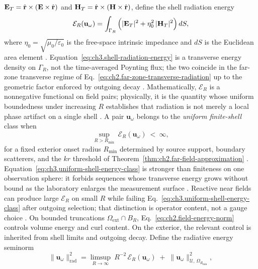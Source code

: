 \(\mathbf{E}_{T}=\hat{\mathbf{r}}\times(\mathbf{E}\times\hat{\mathbf{r}})\) and
\(\mathbf{H}_{T}=\hat{\mathbf{r}}\times(\mathbf{H}\times\hat{\mathbf{r}})\), define the shell radiation energy
\begin{equation}
\label{eq:ch3.shell-radiation-energy}
\mathcal{E}_{R}(\mathbf{u}_\omega)
=
\int_{\Gamma_R}
\Big(
|\mathbf{E}_{T}|^{2}+\eta_0^{2}\,|\mathbf{H}_{T}|^{2}
\Big)\,dS,
\end{equation}
where \(\eta_0=\sqrt{\mu_0/\varepsilon_0}\) is the free-space intrinsic impedance and \(dS\) is the
Euclidean area element \cite{stratton1941}. Equation~\eqref{eq:ch3.shell-radiation-energy}
is a transverse energy density on \(\Gamma_R\), not the time-averaged Poynting flux; the two coincide in
the far-zone transverse regime of Eq.~\eqref{eq:ch2.far-zone-transverse-radiation} up to the geometric
factor enforced by outgoing decay \cite{stratton1941}. Mathematically,
\(\mathcal{E}_{R}\) is a nonnegative functional on field pairs; physically, it is the quantity whose
uniform boundedness under increasing \(R\) establishes that radiation is not merely a local phase artifact
on a single shell \cite{harrington2001}.
A pair \(\mathbf{u}_\omega\) belongs to the \emph{uniform finite-shell} class when
\begin{equation}
\label{eq:ch3.uniform-shell-energy-class}
\sup_{R>R_{\min}}\ \mathcal{E}_{R}(\mathbf{u}_\omega)\ <\ \infty,
\end{equation}
for a fixed exterior onset radius \(R_{\min}\) determined by source support, boundary scatterers, and the
\(kr\) threshold of Theorem~\ref{thm:ch2.far-field-approximation} \cite{stratton1941}.
Equation~\eqref{eq:ch3.uniform-shell-energy-class} is stronger than finiteness on one observation sphere:
it forbids sequences whose transverse energy grows without bound as the laboratory enlarges the
measurement surface \cite{harrington2001}. Reactive near fields can produce large \(\mathcal{E}_{R}\) on
small \(R\) while failing Eq.~\eqref{eq:ch3.uniform-shell-energy-class} after outgoing selection; that
distinction is operator content, not a gauge choice \cite{stratton1941}.
On bounded truncations \(\Omega_{\mathrm{ext}}\cap B_{R}\), Eq.~\eqref{eq:ch2.field-energy-norm} controls
volume energy and curl content. On the exterior, the relevant control is inherited from shell limits and
outgoing decay. Define the radiative energy seminorm
\begin{equation}
\label{eq:ch3.radiative-energy-seminorm}
\|\mathbf{u}_\omega\|_{\mathrm{rad}}^{2}
=
\limsup_{R\to\infty}\ R^{-2}\,\mathcal{E}_{R}(\mathbf{u}_\omega)
\;+\;
\|\mathbf{u}_\omega\|_{\mathcal{U},\,\Omega_{R_{\min}}}^{2},
\end{equation}
